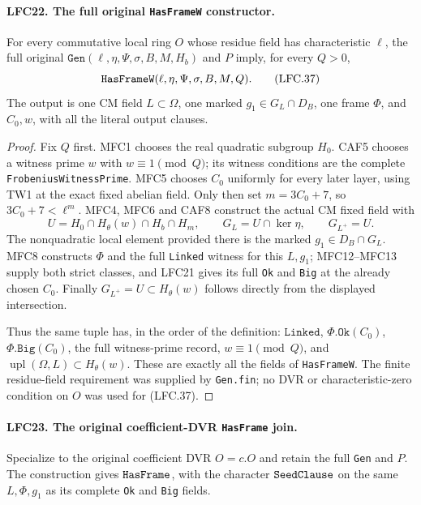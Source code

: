 \documentclass[11pt,a4paper]{article}
\numberwithin{equation}{section}
\theoremstyle{remark}\newtheorem{remark}[theorem]{Remark}
\begin{document}
\paragraph{LFC22. The full original \texttt{Has\allowbreak Frame\allowbreak W} constructor.}
\label{claim:LFC22}
For every commutative local ring \(O\) whose residue
field has characteristic \(\ell\), the full original
\(\texttt{Gen}(\ell,\eta,\Psi,\sigma,B,M,H_b)\) and \(P\)
imply, for every \(Q>0\),
\[
                \texttt{Has\allowbreak Frame\allowbreak W}
                     (\ell,\eta,\Psi,\sigma,B,M,Q).
                                                        \tag{LFC.37}
\]
The output is one CM field \(L\subset\Omega\), one
marked \(g_1\in G_L\cap D_B\), one frame \(\Phi\),
and \(C_0,w\), with all the literal output clauses.

\begin{proof}
Fix \(Q\) first.  MFC1 chooses the real quadratic
subgroup \(H_0\).  CAF5 chooses a witness prime \(w\)
with \(w\equiv1\pmod Q\); its witness conditions are
the complete \texttt{Frobenius\allowbreak Witness\allowbreak Prime}.
MFC5 chooses \(C_0\) uniformly for every later layer,
using TW1 at the exact fixed abelian field.
Only then set \(m=3C_0+7\), so
\(3C_0+7<\ell^m\).
MFC4, MFC6 and CAF8 construct the actual CM fixed
field with
\[
  U=H_0\cap H_\theta(w)\cap H_b\cap H_m,\qquad
  G_L=U\cap\ker\eta,\qquad G_{L^+}=U.
 \]
The nonquadratic local element provided there is the
marked \(g_1\in D_B\cap G_L\).
MFC8 constructs \(\Phi\) and the full \texttt{Linked}
witness for this \(L,g_1\); MFC12--MFC13 supply both
strict classes, and LFC21 gives its full \texttt{Ok}
and \texttt{Big} at the already chosen \(C_0\).
Finally \(G_{L^+}=U\subset H_\theta(w)\) follows directly
from the displayed intersection.

Thus the same tuple has, in the order of the definition:
\(\texttt{Linked}\), \(\Phi.\texttt{Ok}(C_0)\),
\(\Phi.\texttt{Big}(C_0)\), the full witness-prime record,
\(w\equiv1\pmod Q\), and
\(\operatorname{upl}(\Omega,L)\subset H_\theta(w)\).
These are exactly all the fields of \texttt{Has\allowbreak Frame\allowbreak W}.
The finite residue-field requirement was supplied by
\texttt{Gen.\allowbreak fin}; no DVR or characteristic-zero condition
on \(O\) was used for (LFC.37).
\end{proof}

\paragraph{LFC23. The original coefficient-DVR \texttt{Has\allowbreak Frame} join.}
\label{claim:LFC23}
Specialize to the original coefficient DVR \(O=c.O\)
and retain the full \texttt{Gen} and \(P\).
The construction gives \(\texttt{Has\allowbreak Frame}\), with
the character \(\texttt{Seed\allowbreak Clause}\) on the same
\(L,\Phi,g_1\) as its complete \texttt{Ok} and
\texttt{Big} fields.
\end{document}
